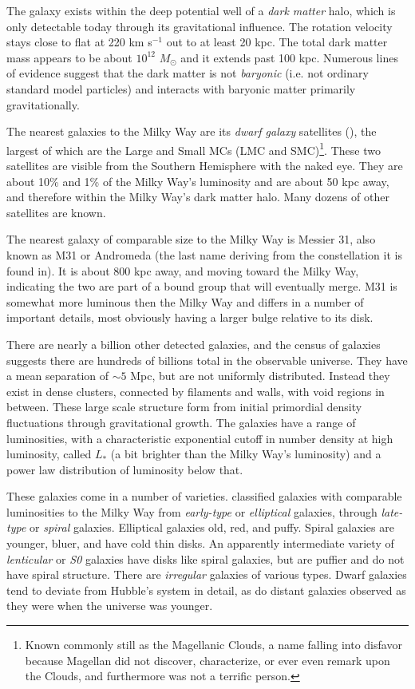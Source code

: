 The galaxy exists within the deep potential well of a {\it dark
  matter} halo, which is only detectable today through its
gravitational influence. The rotation velocity stays close to flat at
220 km s$^{-1}$ out to at least 20 kpc. The total dark matter mass
appears to be about $10^{12}$ $M_\odot$ and it extends past 100
kpc. Numerous lines of evidence suggest that the dark matter is not
{\it baryonic} (i.e. not ordinary standard model particles) and
interacts with baryonic matter primarily gravitationally.

The nearest galaxies to the Milky Way are its {\it dwarf galaxy}
satellites (\citealt{mcconnachie12a}), the largest of which are the
Large and Small MCs (LMC and SMC)\footnote{Known commonly still as the
Magellanic Clouds, a name falling into disfavor because Magellan did
not discover, characterize, or ever even remark upon the Clouds, and
furthermore was not a terrific person.}. These two satellites are
visible from the Southern Hemisphere with the naked eye. They are
about 10\% and 1\% of the Milky Way's luminosity and are about 50 kpc
away, and therefore within the Milky Way's dark matter halo. Many
dozens of other satellites are known.

The nearest galaxy of comparable size to the Milky Way is Messier 31,
also known as M31 or Andromeda (the last name deriving from the
constellation it is found in). It is about 800 kpc away, and moving
toward the Milky Way, indicating the two are part of a bound group
that will eventually merge. M31 is somewhat more luminous then the
Milky Way and differs in a number of important details, most obviously
having a larger bulge relative to its disk.

There are nearly a billion other detected galaxies, and the census of
galaxies suggests there are hundreds of billions total in the
observable universe. They have a mean separation of $\sim 5$ Mpc, but
are not uniformly distributed. Instead they exist in dense clusters,
connected by filaments and walls, with void regions in between. These
large scale structure form from initial primordial density
fluctuations through gravitational growth. The galaxies have a range
of luminosities, with a characteristic exponential cutoff in number
density at high luminosity, called $L_\ast$ (a bit brighter than the
Milky Way's luminosity) and a power law distribution of luminosity
below that.

These galaxies come in a number of varieties. \citet{hubble36a}
classified galaxies with comparable luminosities to the Milky Way from
{\it early-type} or {\it elliptical} galaxies, through {\it late-type}
or {\it spiral} galaxies.  Elliptical galaxies old, red, and
puffy. Spiral galaxies are younger, bluer, and have cold thin
disks. An apparently intermediate variety of {\it lenticular} or {\it
S0} galaxies have disks like spiral galaxies, but are puffier and do
not have spiral structure. There are {\it irregular} galaxies of
various types. Dwarf galaxies tend to deviate from Hubble's system in
detail, as do distant galaxies observed as they were when the universe
was younger.

